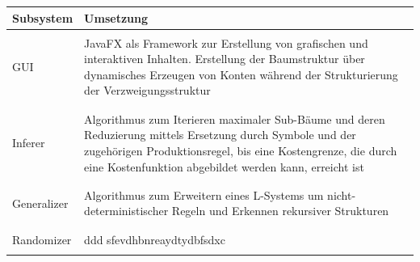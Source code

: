 \documentclass[11pt]{article}
\begin{document}
    \begin{center}
        \begin{tabular}{l|l}
            \textbf{Subsystem} & \textbf{Umsetzung} \\
            \hline \\
            GUI &
            \begin{minipage}[t]{0.8\textwidth}
               JavaFX als Framework zur Erstellung von grafischen und interaktiven Inhalten.
                Erstellung der Baumstruktur über dynamisches Erzeugen von Konten während der Strukturierung der
               Verzweigungsstruktur
            \end{minipage} \\
            \\ \hline \\
            Inferer &
            \begin{minipage}[t]{0.8\textwidth}
                Algorithmus zum Iterieren maximaler Sub-Bäume und deren Reduzierung mittels Ersetzung durch Symbole
                und der zugehörigen Produktionsregel, bis eine Kostengrenze, die durch eine Kostenfunktion abgebildet
                werden kann, erreicht ist
            \end{minipage} \\
            \\ \hline \\
            Generalizer &
            \begin{minipage}[t]{0.8\textwidth}
                Algorithmus zum Erweitern eines L-Systems um nicht-deterministischer Regeln und Erkennen rekursiver
                Strukturen
            \end{minipage} \\
            \\ \hline \\
            Randomizer &
            \begin{minipage}[t]{0.8\textwidth}
    ddd         sfevdhbnreaydtydbfsdxc
            \end{minipage} \\
            \\ \hline
        \end{tabular}
    \end{center}

    \newpage
\end{document}
